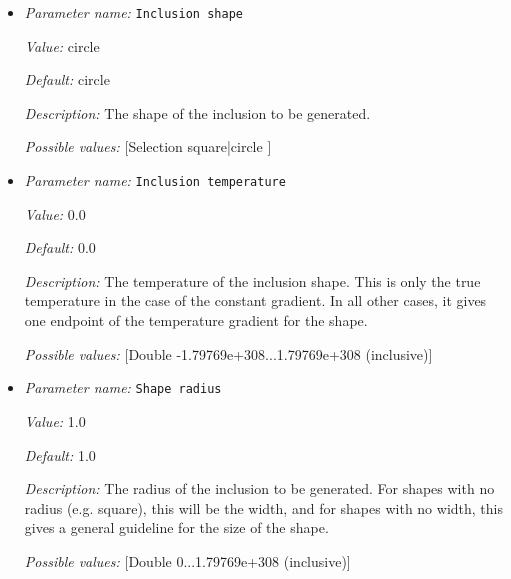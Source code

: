 \begin{itemize}
{\it Value:} constant


{\it Default:} constant


{\it Description:} The gradient of the inclusion to be generated.


{\it Possible values:} [Selection gaussian|linear|constant ]
\item {\it Parameter name:} {\tt Inclusion shape}
\label{parameters:Initial conditions/Inclusion shape perturbation/Inclusion shape}


{\it Value:} circle


{\it Default:} circle


{\it Description:} The shape of the inclusion to be generated.


{\it Possible values:} [Selection square|circle ]
\item {\it Parameter name:} {\tt Inclusion temperature}
\label{parameters:Initial conditions/Inclusion shape perturbation/Inclusion temperature}


{\it Value:} 0.0


{\it Default:} 0.0


{\it Description:} The temperature of the inclusion shape. This is only the true temperature in the case of the constant gradient. In all other cases, it gives one endpoint of the temperature gradient for the shape.


{\it Possible values:} [Double -1.79769e+308...1.79769e+308 (inclusive)]
\item {\it Parameter name:} {\tt Shape radius}
\label{parameters:Initial conditions/Inclusion shape perturbation/Shape radius}


{\it Value:} 1.0


{\it Default:} 1.0


{\it Description:} The radius of the inclusion to be generated. For shapes with no radius (e.g. square), this will be the width, and for shapes with no width, this gives a general guideline for the size of the shape.


{\it Possible values:} [Double 0...1.79769e+308 (inclusive)]
\end{itemize}

